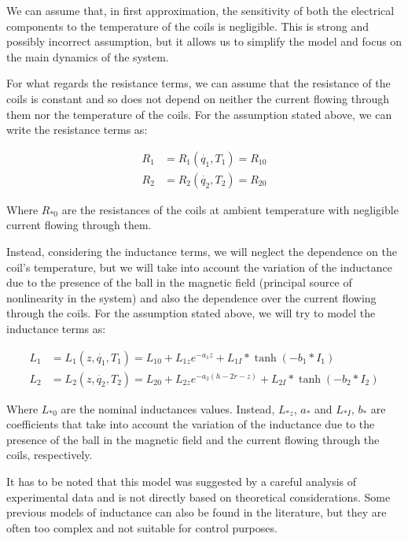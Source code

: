We can assume that, in first approximation, the sensitivity of both the electrical components to the temperature of the coils is negligible.
This is strong and possibly incorrect assumption, but it allows us to simplify the model and focus on the main dynamics of the system.

For what regards the resistance terms, we can assume that the resistance of the coils is constant and so does not depend on neither the current flowing through them nor the temperature of the coils.
For the assumption stated above, we can write the resistance terms as:

\begin{equation}
    \begin{aligned}
        R_1 & = R_1(\dot{q_1}, T_1) = R_{10} \\
        R_2 & = R_2(\dot{q_2}, T_2) = R_{20}
    \end{aligned}
    \label{eq:model_for_resistance}
\end{equation}

Where $R_{*0}$ are the resistances of the coils at ambient temperature with negligible current flowing through them.

Instead, considering the inductance terms, we will neglect the dependence on the coil's temperature, but we will take into account the variation of the inductance due to the presence of the ball in the magnetic field (principal source of nonlinearity in the system) and also the dependence over the current flowing through the coils.
For the assumption stated above, we will try to model the inductance terms as:

\begin{equation}
    \begin{aligned}
        L_1 & = L_1(z, \dot{q_1}, T_1) = L_{10} + L_{1z} e^{-a_1 z} + L_{1I} * \tanh(-b_1 * I_{1})            \\
        L_2 & = L_2(z, \dot{q_2}, T_2) = L_{20} + L_{2z} e^{-a_2 (h - 2r - z)} + L_{2I} * \tanh(-b_2 * I_{2})
    \end{aligned}
    \label{eq:model_for_inductance}
\end{equation}

Where $L_{*0}$ are the nominal inductances values. Instead, $L_{*z}$, $a_*$ and $L_{*I}$, $b_*$ are coefficients that take into account the variation of the inductance due to the presence of the ball in the magnetic field and the current flowing through the coils, respectively.

It has to be noted that this model was suggested by a careful analysis of experimental data and is not directly based on theoretical considerations.
Some previous models of inductance can also be found in the literature, but they are often too complex and not suitable for control purposes.


